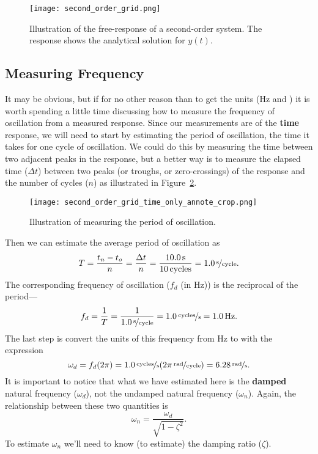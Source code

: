 \begin{figure}[h!bt]
\centerline{
{\texttt{[image: second\_order\_grid.png]}}}
\caption{Illustration of the free-response of a second-order system.  The response shows the analytical solution for $y(t)$.}
\label{f:secondfreeresp}
\end{figure}

\subsection{Measuring Frequency}
It may be obvious, but if for no other reason than to get the units (\unit[]{Hz} and ) it is worth spending a little time discussing how to measure the frequency of oscillation from a measured response.  Since our measurements are of the {\bf time} response, we will need to start by estimating the period of oscillation, the time it takes for one cycle of oscillation.  We could do this by measuring the time between two adjacent peaks in the response, but a better way is to measure the elapsed time ($\Delta t$) between two peaks (or troughs, or zero-crossings) of the response and the number of cycles ($n$) as illustrated in Figure~\ref{f:secondtime}.
\begin{figure}[h!bt]
\centerline{
{\texttt{[image: second\_order\_grid\_time\_only\_annote\_crop.png]}}}
\caption{Illustration of measuring the period of oscillation.}
\label{f:secondtime}
\end{figure}
Then we can estimate the average period of oscillation as
\begin{equation}
T = \frac{t_n-t_o}{n}=\frac{\Delta t}{n}=\frac{\unit[10.0]{s}}{\unit[10]{cycles}} = \unitfrac[1.0]{s}{cycle}.
\end{equation}
The corresponding frequency of oscillation ($f_d$ (in Hz)) is the reciprocal of the period---
\begin{equation}
f_d = \frac{1}{T} = \frac{1}{\unitfrac[1.0]{s}{cycle}} = \unitfrac[1.0]{cycles}{s} = \unit[1.0]{Hz}.
\end{equation}
The last step is convert the units of this frequency from Hz to  with the expression
\begin{equation}
\omega_d = f_d (2 \pi) = \unitfrac[1.0]{cycles}{s} (\unitfrac[2 \pi]{rad}{cycle}) = \unitfrac[6.28]{rad}{s}.
\end{equation}
It is important to notice that what we have estimated here is the {\bf damped} natural frequency ($\omega_d$), not the undamped natural frequency ($\omega_n$).  Again, the relationship between these two quantities is
\begin{equation}
\omega_n = \frac{\omega_d}{\sqrt{1-\zeta^2}}.
\end{equation}
To estimate $\omega_n$ we'll need to know (to estimate) the damping ratio ($\zeta$).

